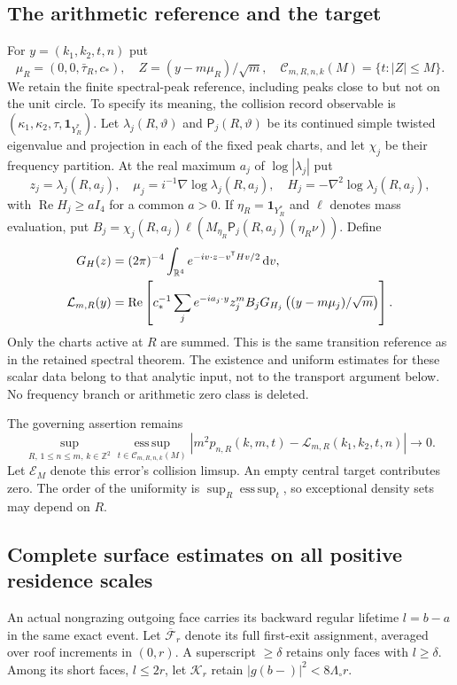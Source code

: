 \documentclass[11pt,reqno]{amsart}
\numberwithin{equation}{section}
\theoremstyle{definition}\newtheorem{definition}[theorem]{Definition}
\theoremstyle{remark}\newtheorem{remark}[theorem]{Remark}
\newcommand{\R}{\mathbb R}\newcommand{\Z}{\mathbb Z}\newcommand{\T}{\mathbb T}
\newcommand{\dd}{\,\mathrm d}\newcommand{\one}{\mathbf1}
\theoremstyle{definition}\newtheorem{inputstatement}[theorem]{Input statement}
\newcommand{\esssup}{\operatorname*{ess\,sup}}
\begin{document}
\subsection{The arithmetic reference and the target}
For $y=(k_1,k_2,t,n)$ put
\[
 \mu_R=(0,0,\bar\tau_R,c_*),\quad
 Z=(y-m\mu_R)/\sqrt m,\quad
 \mathcal C_{m,R,n,k}(M)=\{t:|Z|\le M\}.
\]
We retain the finite spectral-peak reference, including peaks close to
but not on the unit circle. To specify its meaning, the collision
record observable is $(\kappa_1,\kappa_2,\tau,\one_{Y_R^*})$.
Let $\lambda_j(R,\vartheta)$ and $\mathsf P_j(R,\vartheta)$ be its
continued simple twisted eigenvalue and projection in each of the
fixed peak charts, and let $\chi_j$ be their frequency partition.
At the real maximum $a_j$ of $\log|\lambda_j|$ put
\[
 z_j=\lambda_j(R,a_j),\quad
 \mu_j=i^{-1}\nabla\log\lambda_j(R,a_j),\quad
 H_j=-\nabla^2\log\lambda_j(R,a_j),
\]
with $\operatorname{Re}H_j\ge aI_4$ for a common $a>0$. If
$\eta_R=\one_{Y_R^*}$ and $\ell$ denotes mass evaluation, put
$B_j=\chi_j(R,a_j)\ell(M_{\eta_R}\mathsf P_j(R,a_j)(\eta_R\nu))$.
Define
\begin{align}
 G_H(z)&=(2\pi)^{-4}\int_{\R^4}e^{-iv\cdot z-v^{\mathsf T}Hv/2}\dd v,
 \notag\\
 \mathcal L_{m,R}(y)&=\operatorname{Re}\left[
 c_*^{-1}\sum_j e^{-ia_j\cdot y}z_j^m B_j
      G_{H_j}\left((y-m\mu_j)/\sqrt m\right)\right].
 \label{eq:v76-reference}
\end{align}
Only the charts active at $R$ are summed. This is the same transition
reference as in the retained spectral theorem. The existence and
uniform estimates for these scalar data belong to that analytic
input, not to the transport argument below. No frequency branch or
arithmetic zero class is deleted.

The governing assertion remains
\begin{equation}\label{eq:v76-target}
 \sup_{R,\,1\le n\le m,\,k\in\Z^2}
 \esssup_{t\in\mathcal C_{m,R,n,k}(M)}
 |m^2p_{n,R}(k,m,t)-\mathcal L_{m,R}(k_1,k_2,t,n)|\longrightarrow0.
\end{equation}
Let $\mathcal E_M$ denote this error's collision limsup. An empty
central target contributes zero. The order of the uniformity is
$\sup_R\esssup_t$, so exceptional density sets may depend on $R$.

\subsection{Complete surface estimates on all positive residence scales}
An actual nongrazing outgoing face carries its backward regular lifetime
$l=b-a$ in the same exact event. Let $\overline{\mathcal F}_r$ denote
its full first-exit assignment, averaged over roof increments in $(0,r)$.
A superscript $\ge\delta$ retains only faces with $l\ge\delta$.
Among its short faces, $l\le2r$, let $\mathcal K_r$ retain
$|g(b-)|^2<8\Lambda_\circ r$.
\end{document}
